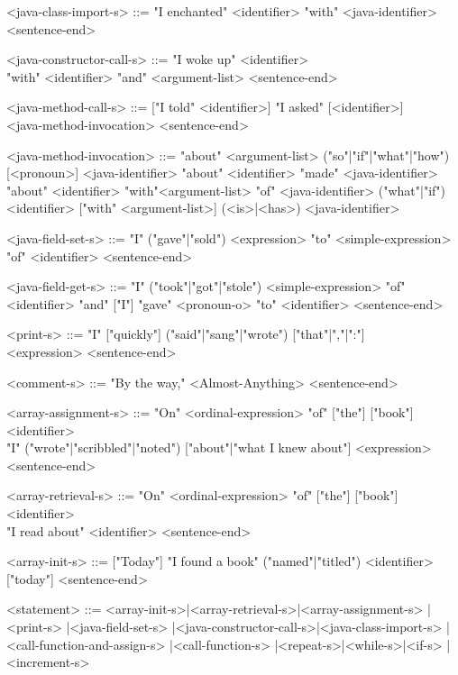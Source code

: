 \documentclass[12pt,a4paper]{article}
\begin{document}
\begin{grammar}
<java-class-import-s> ::= "I enchanted" <identifier> "with" <java-identifier> <sentence-end>

<java-constructor-call-s> ::= "I woke up" <identifier>\\"with" <identifier> "and" <argument-list> <sentence-end>

<java-method-call-s> ::= ["I told" <identifier>] "I asked" [<identifier>]\\ <java-method-invocation> <sentence-end>

<java-method-invocation> ::= "about" <argument-list> ("so"|"if"|"what"|"how") [<pronoun>] <java-identifier> 
  \alt "about" <identifier> "made" <java-identifier>
  \alt "about" <identifier> "with"<argument-list> "of" <java-identifier>
  \alt ("what"|"if") <identifier> ["with" <argument-list>] (<is>|<has>) <java-identifier>
  
<java-field-set-s> ::= "I" ("gave"|"sold") <expression> "to" <simple-expression> "of" <identifier> <sentence-end>

<java-field-get-s> ::= "I" ("took"|"got"|"stole") <simple-expression> "of" <identifier> "and" ["I"] "gave" <pronoun-o> "to" <identifier> <sentence-end>

<print-s> ::= "I" ["quickly"] ("said"|"sang"|"wrote") ["that"|","|":"]\\<expression> <sentence-end>

<comment-s> ::= "By the way," <Almost-Anything>  <sentence-end>

<array-assignment-s> ::= "On" <ordinal-expression> "of" ["the"] ["book"] <identifier>\\"I" ("wrote"|"scribbled"|"noted") ["about"|"what I knew about"] <expression> <sentence-end>

<array-retrieval-s> ::= "On" <ordinal-expression> "of" ["the"] ["book"] <identifier>\\"I read about" <identifier> <sentence-end>

<array-init-s> ::= ["Today"] "I found a book" ("named"|"titled") <identifier> ["today"] <sentence-end>

<statement> ::= <array-init-s>|<array-retrieval-s>|<array-assignment-s>
  |<print-s>
  |<java-field-set-s>
  |<java-constructor-call-s>|<java-class-import-s>
  |<call-function-and-assign-s>
  |<call-function-s>
  |<repeat-s>|<while-s>|<if-s>
  |<increment-s>
  
\end{grammar}
\end{document}
